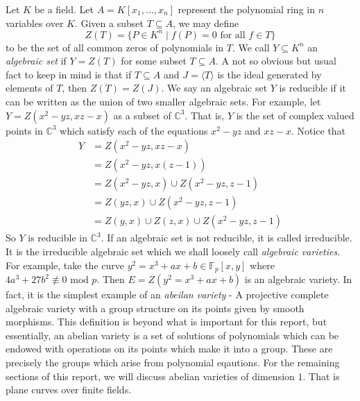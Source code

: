 Let $K$ be a field. Let $A = K[x_1,...,x_n]$ represent the polynomial ring in $n$ variables over $K$. Given a subset $T \subseteq A$, we may define 
$$
Z(T) = \lbrace P \in K^n \mid f(P) = 0 \text{ for all } f \in T \rbrace 
$$
to be the set of all common zeros of polynomials in $T$. We call $Y \subseteq K^n $ an \textit{algebraic set} if $Y = Z(T)$ for some subset $T \subseteq A$. A not so obvious but usual fact to keep in mind is that if $T \subseteq A$ and $J = \langle T \rangle $ is the ideal generated by elements of $T$, then $Z(T) = Z(J)$. We say an algebraic set $Y$ is reducible if it can be written as the union of two smaller algebraic sets. For example, let $Y = Z(x^2 - yz, xz-x)$ as a subset of $\mathbb{C}^3$. That is, $Y$ is the set of complex valued points in $\mathbb{C}^3$ which satisfy each of the equations $x^2 - yz$ and $xz-x$. Notice that
\begin{align*}
	Y &= Z(x^2 - yz, xz-x) \\
	&= Z(x^2 - yz, x(z-1)) \\
	&= Z(x^2 - yz,x) \cup Z(x^2 - yz,z-1) \\
	&= Z(yz,x) \cup Z(x^2 - yz,z -1) \\
	&= Z(y,x) \cup Z(z,x) \cup Z(x^2 - yz, z - 1)
\end{align*} 
So $Y$ is reducible in $\mathbb{C}^3$. If an algebraic set is not reducible, it is called irreducible. It is the irreducible algebraic set which we shall loosely call \textit{algebraic varieties}. For example, take the curve $y^2 = x^3 + ax + b \in \mathbb{F}_p[x,y]$ where $4a^3 + 27b^2 \not\equiv 0 \text{ mod } p$. Then $E = Z(y^2 = x^3 + ax + b)$ is an algebraic variety. In fact, it is the simplest example of an \textit{abeilan variety} - A projective complete algebraic variety with a group structure on its points given by smooth morphisms. This definition is beyond what is important for this report, but essentially, an abelian variety is a set of solutions of polynomials which can be endowed with operations on its points which make it into a group. These are precisely the groups which arise from polynomial eqautions. For the remaining sections of this report, we will discuss abelian varieties of dimension $1$. That is plane curves over finite fields.  


